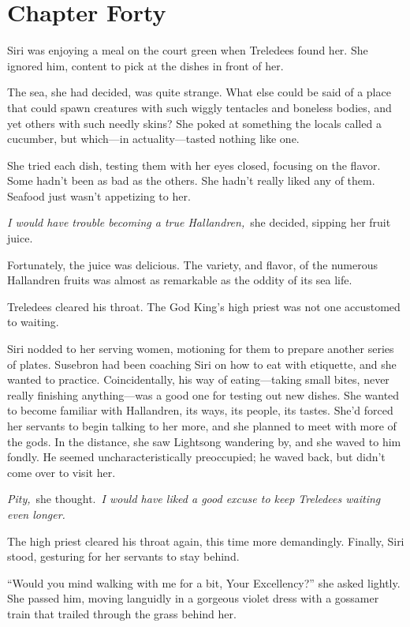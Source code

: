 \section{Chapter Forty}

Siri was enjoying a meal on the court green when Treledees found her. She ignored him, content to pick at the dishes in front of her.

The sea, she had decided, was quite strange. What else could be said of a place that could spawn creatures with such wiggly tentacles and boneless bodies, and yet others with such needly skins? She poked at something the locals called a cucumber, but which—in actuality—tasted nothing like one.

She tried each dish, testing them with her eyes closed, focusing on the flavor. Some hadn’t been as bad as the others. She hadn’t really liked any of them. Seafood just wasn’t appetizing to her.

\textit{I would have trouble becoming a true Hallandren,}~she decided, sipping her fruit juice.

Fortunately, the juice was delicious. The variety, and flavor, of the numerous Hallandren fruits was almost as remarkable as the oddity of its sea life.

Treledees cleared his throat. The God King’s high priest was not one accustomed to waiting.

Siri nodded to her serving women, motioning for them to prepare another series of plates. Susebron had been coaching Siri on how to eat with etiquette, and she wanted to practice. Coincidentally, his way of eating—taking small bites, never really finishing anything—was a good one for testing out new dishes. She wanted to become familiar with Hallandren, its ways, its people, its tastes. She’d forced her servants to begin talking to her more, and she planned to meet with more of the gods. In the distance, she saw Lightsong wandering by, and she waved to him fondly. He seemed uncharacteristically preoccupied; he waved back, but didn’t come over to visit her.

\textit{Pity,}~she thought.~\textit{I would have liked a good excuse to keep Treledees waiting even longer.}

The high priest cleared his throat again, this time more demandingly. Finally, Siri stood, gesturing for her servants to stay behind.

“Would you mind walking with me for a bit, Your Excellency?” she asked lightly. She passed him, moving languidly in a gorgeous violet dress with a gossamer train that trailed through the grass behind her.

